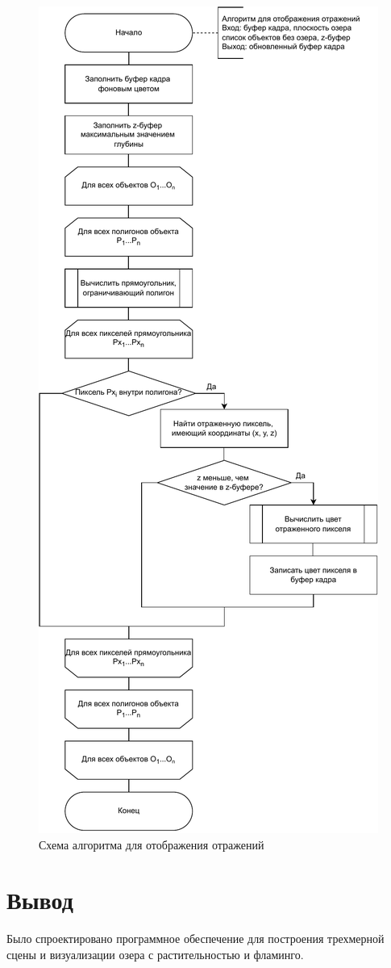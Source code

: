 \begin{figure}[h!]
	\centering
	\includegraphics[width=0.62\linewidth]{img/reflect}
	\caption{Схема алгоритма для отображения отражений}
	\label{fig:reflect}
\end{figure}
\clearpage



\section*{Вывод}

Было спроектировано программное обеспечение для построения трехмерной сцены и визуализации озера с растительностью и фламинго.